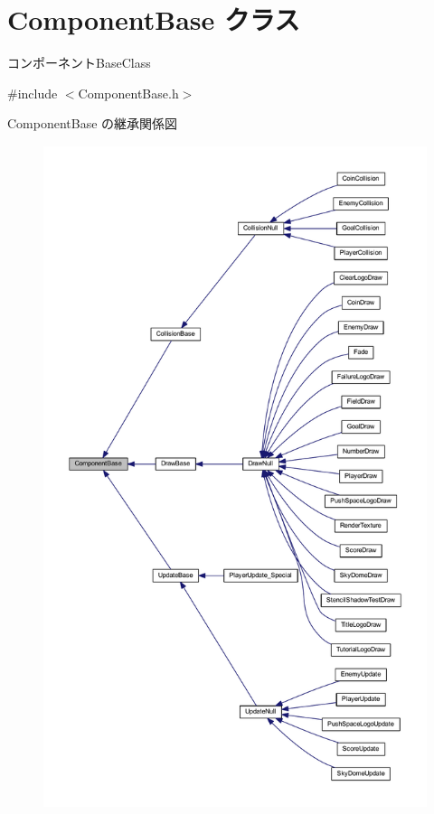 \hypertarget{class_component_base}{}\section{Component\+Base クラス}
\label{class_component_base}


コンポーネント\+Base\+Class  




{\ttfamily \#include $<$Component\+Base.\+h$>$}



Component\+Base の継承関係図\nopagebreak
\begin{figure}[H]
\begin{center}
\leavevmode
\includegraphics[height=550pt]{class_component_base__inherit__graph}
\end{center}
\end{figure}
